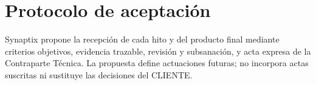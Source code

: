 \documentclass[11pt,letterpaper]{report}
\begin{document}
\tableofcontents\clearpage
\chapter*{Protocolo de aceptación}
Synaptix propone la recepción de cada hito y del producto final mediante criterios objetivos, evidencia trazable, revisión y subsanación, y acta expresa de la Contraparte Técnica. La propuesta define actuaciones futuras; no incorpora actas suscritas ni sustituye las decisiones del CLIENTE. \parencite[Formulario T-17, p.~64; art.~18, p.~13]{sd9-ba}

\CierreSubdocumento
\end{document}
